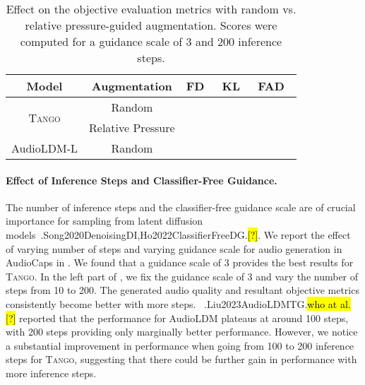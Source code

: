 \documentclass{article}
\newcommand{\model}{\textsc{Tango}}
\let\realcite\cite
\renewcommand{\cite}[1]{\ifx.#1.\hl{[?]}\else\realcite{#1}\fi}
\let\realcitet\citet
\renewcommand{\citet}[1]{\ifx.#1.\hl{who at al. [?]}\else\realcitet{#1}\fi}
\begin{document}
\begin{table}[ht!]
\centering
\caption{Effect on the objective evaluation metrics with random vs. relative pressure-guided augmentation. Scores were computed for a guidance scale of 3 and 200 inference steps.}
\begin{tabular}{c|cccc}
\toprule
Model & Augmentation & FD~ & KL~ & FAD~ \\
\midrule
\multirow{2}{*}{\model{}} & Random &  &  &  \\
& Relative Pressure &  &  &  \\
\midrule
AudioLDM-L & Random &   &  &  \\
\bottomrule
\end{tabular}
\label{tab:augmentation}
\end{table} 
\paragraph{Effect of Inference Steps and Classifier-Free Guidance.}
The number of inference steps and the classifier-free guidance scale are of crucial importance for sampling from latent diffusion models~\cite{Song2020DenoisingDI,Ho2022ClassifierFreeDG}. We report the effect of varying number of steps and varying guidance scale for audio generation in AudioCaps in . We found that a guidance scale of 3 provides the best results for \model{}. In the left part of , we fix the guidance scale of 3 and vary the number of steps from 10 to 200. The generated audio quality and resultant objective metrics consistently become better with more steps. ~\citet{Liu2023AudioLDMTG} reported that the performance for AudioLDM plateaus at around 100 steps, with 200 steps providing only marginally better performance. However, we notice a substantial improvement in performance when going from 100 to 200 inference steps for \model{}, suggesting that there could be further gain in performance with more inference steps. 
\end{document}
